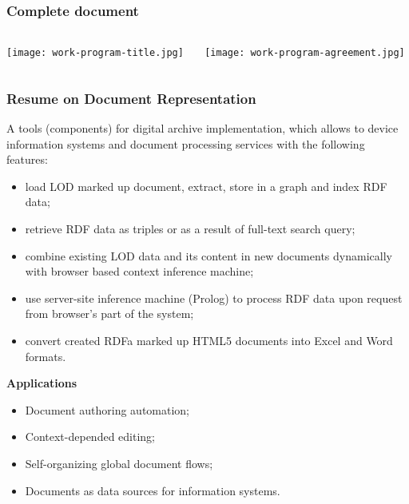 \documentclass[10pt]{beamer}
\begin{document}
\begin{frame}
  \frametitle{Complete document}
  \begin{adjustwidth}{-2.5em}{-2.5em}
    \begin{center}
      \begin{columns}
        \begin{column}{0.5\linewidth}
          \texttt{[image: work-program-title.jpg]}
        \end{column}
        \begin{column}{0.5\linewidth}
          \texttt{[image: work-program-agreement.jpg]}
        \end{column}
    \end{columns}
    \end{center}
  \end{adjustwidth}
\end{frame}

\begin{frame}
  \frametitle{Resume on Document Representation}
A tools (components) for digital archive implementation, which allows
to device information systems and document processing services
with the following features:
\begin{itemize}
\item load LOD marked up document, extract, store in a graph and index RDF data;
\item retrieve RDF data as triples or as a result of full-text search query;
\item combine existing LOD data and its content in new documents dynamically with browser based context inference machine;
\item use server-site inference machine (Prolog) to process RDF data upon
  request from browser's part of the system;
\item convert created RDFa marked up HTML5 documents into Excel and Word formats.
\end{itemize}

  \textbf{Applications}
  \begin{itemize}
  \item Document authoring automation;
  \item Context-depended editing;
  \item Self-organizing global document flows;
  \item Documents as data sources for information systems.
  \end{itemize}

\end{frame}
\end{document}

